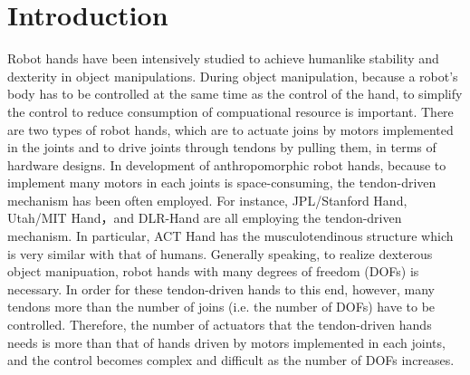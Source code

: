 \documentclass{llncs}
\begin{document}
\section{Introduction} %
\label{sec:introduction}
Robot hands have been intensively studied to achieve humanlike stability
and dexterity in object manipulations.
During object manipulation, because a robot's body has to be controlled
at the same time as the control of the hand, to simplify the control to
reduce consumption of compuational resource is important.
There are two types of robot hands, which are to actuate joins by
motors implemented in the joints and to drive joints through tendons by
pulling them, in terms of hardware designs.
In development of anthropomorphic robot hands, because to implement many
motors in each joints is space-consuming, the tendon-driven mechanism
has been often employed.
For instance, JPL/Stanford Hand\cite{Loucks1987}, Utah/MIT
Hand\cite{Jacobsen1986}，and DLR-Hand\cite{Butterfass2001} are all
employing the tendon-driven mechanism.
In particular, ACT Hand\cite{Weghe2004} has the musculotendinous
structure which is very similar with that of humans.
Generally speaking, to realize dexterous object manipuation, robot hands
with many degrees of freedom (DOFs) is necessary.
In order for these tendon-driven hands to this end, however, many
tendons more than the number of joins (i.e. the number of DOFs) have to
be controlled.
Therefore, the number of actuators that the tendon-driven hands needs is
more than that of hands driven by motors implemented in each joints, and
the control becomes complex and difficult as the number of DOFs increases.
\end{document}
